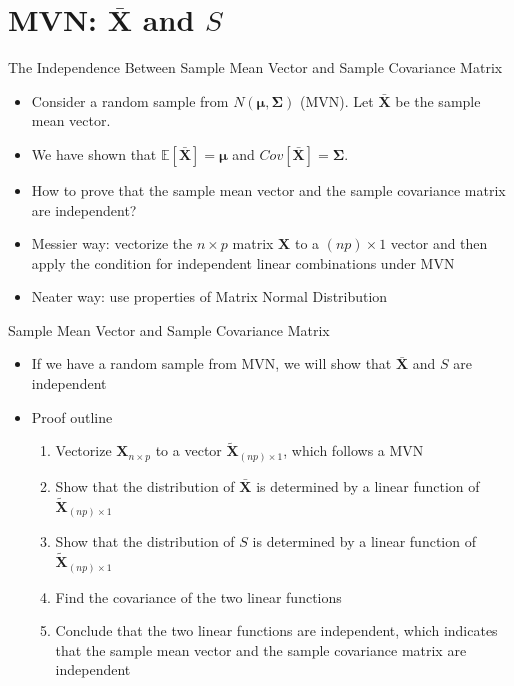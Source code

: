 \documentclass[
  ignorenonframetext,
]{beamer}
\providecommand{\tightlist}{%
  \setlength{\itemsep}{0pt}\setlength{\parskip}{0pt}}
\begin{document}
\hypertarget{mvn-bar-mathbf-x-and-s}{%
\section{\texorpdfstring{MVN: \(\bar {\mathbf X}\) and
\(S\)}{MVN: \textbackslash bar \{\textbackslash mathbf X\} and S}}\label{mvn-bar-mathbf-x-and-s}}

\begin{frame}{The Independence Between Sample Mean Vector and Sample
Covariance Matrix}
\protect\hypertarget{the-independence-between-sample-mean-vector-and-sample-covariance-matrix}{}
\begin{itemize}
\tightlist
\item
  Consider a random sample from
  \(N(\boldsymbol \mu, \boldsymbol \Sigma)\) (MVN). Let
  \(\bar{\boldsymbol X}\) be the sample mean vector.
\item
  We have shown that \(\mathbb E[\bar{\mathbf X}]=\boldsymbol \mu\) and
  \(Cov[\bar{\mathbf X}]=\boldsymbol \Sigma\).
\item
  How to prove that the sample mean vector and the sample covariance
  matrix are independent?
\item
  Messier way: vectorize the \(n\times p\) matrix \(\mathbf X\) to a
  \((np)\times 1\) vector and then apply the condition for independent
  linear combinations under MVN
\item
  Neater way: use properties of Matrix Normal Distribution
\end{itemize}
\end{frame}

\begin{frame}{Sample Mean Vector and Sample Covariance Matrix}
\protect\hypertarget{sample-mean-vector-and-sample-covariance-matrix}{}
\begin{itemize}
\tightlist
\item
  If we have a random sample from MVN, we will show that
  \(\bar{\mathbf X}\) and \(S\) are independent
\item
  Proof outline

  \begin{enumerate}
  \tightlist
  \item
    Vectorize \(\mathbf X_{n\times p}\) to a vector
    \(\tilde {\mathbf X}_{(np)\times 1}\), which follows a MVN
  \item
    Show that the distribution of \(\bar{\mathbf X}\) is determined by a
    linear function of \(\tilde {\mathbf X}_{(np)\times 1}\)
  \item
    Show that the distribution of \(S\) is determined by a linear
    function of \(\tilde {\mathbf X}_{(np)\times 1}\)
  \item
    Find the covariance of the two linear functions
  \item
    Conclude that the two linear functions are independent, which
    indicates that the sample mean vector and the sample covariance
    matrix are independent
  \end{enumerate}
\end{itemize}
\end{frame}
\end{document}
